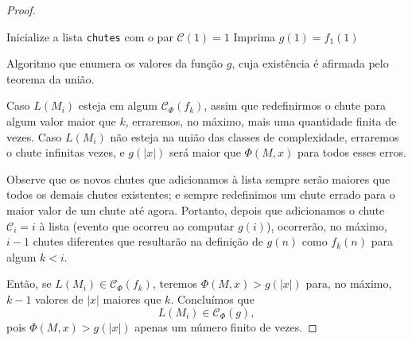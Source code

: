 \begin{proof}
    \begin{algorithm}[h]
        Inicialize a lista \texttt{chutes} com o par $\mathcal C(1) = 1$ \;
        Imprima $g(1) = f_1(1)$ \;
        \caption{
            Algoritmo que enumera os valores da função $g$,
            cuja existência é afirmada pelo teorema da união.
        }
        \label{algoritmo_uniao}
    \end{algorithm}

    Caso $L(M_i)$ esteja em algum $\mathcal C_\Phi(f_k)$,
    assim que redefinirmos o chute para algum valor maior que $k$,
    erraremos, no máximo,
    mais uma quantidade finita de vezes.
    Caso $L(M_i)$ não esteja na união das classes de complexidade,
    erraremos o chute infinitas vezes,
    e $g(|x|)$ será maior que $\Phi(M, x)$ para todos esses erros.

    Observe que os novos chutes que adicionamos à lista
    sempre serão maiores que todos os demais chutes existentes;
    e sempre redefinimos um chute errado
    para o maior valor de um chute até agora.
    Portanto, depois que adicionamos o chute
    $\mathcal C_i = i$ à lista
    (evento que ocorreu ao computar $g(i)$),
    ocorrerão, no máximo,
    $i-1$ chutes diferentes
    que resultarão na definição de $g(n)$ como $f_k(n)$
    para algum $k < i$.

    Então, se $L(M_i) \in \mathcal C_\Phi(f_k)$,
    teremos $\Phi(M, x) > g(|x|)$
    para, no máximo, $k-1$ valores de $|x|$ maiores que $k$.
    Concluímos que
    \begin{equation*}
        L(M_i) \in \mathcal C_\Phi(g),
    \end{equation*}
    pois $\Phi(M, x) > g(|x|)$ apenas um número finito de vezes.


\end{proof}
